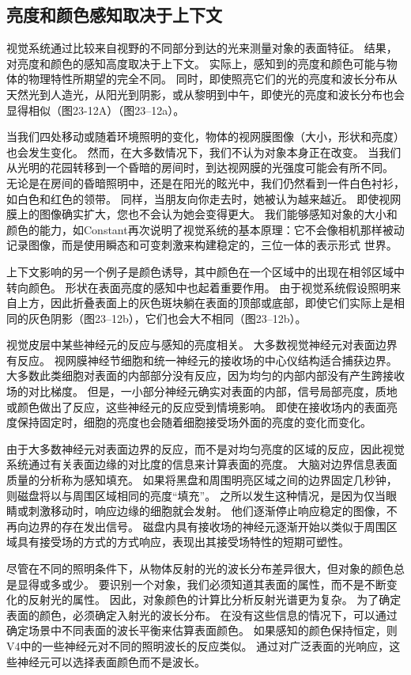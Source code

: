 \subsection{亮度和颜色感知取决于上下文}
视觉系统通过比较来自视野的不同部分到达的光来测量对象的表面特征。 结果，对亮度和颜色的感知高度取决于上下文。 实际上，感知到的亮度和颜色可能与物体的物理特性所期望的完全不同。 同时，即使照亮它们的光的亮度和波长分布从天然光到人造光，从阳光到阴影，或从黎明到中午，即使光的亮度和波长分布也会显得相似（图23-12A）（图23–12a）。

当我们四处移动或随着环境照明的变化，物体的视网膜图像（大小，形状和亮度）也会发生变化。 然而，在大多数情况下，我们不认为对象本身正在改变。 当我们从光明的花园转移到一个昏暗的房间时，到达视网膜的光强度可能会有所不同。 无论是在房间的昏暗照明中，还是在阳光的眩光中，我们仍然看到一件白色衬衫，如白色和红色的领带。 同样，当朋友向你走去时，她被认为越来越近。 即使视网膜上的图像确实扩大，您也不会认为她会变得更大。 我们能够感知对象的大小和颜色的能力，如Constant再次说明了视觉系统的基本原理：它不会像相机那样被动记录图像，而是使用瞬态和可变刺激来构建稳定的，三位一体的表示形式 世界。

上下文影响的另一个例子是颜色诱导，其中颜色在一个区域中的出现在相邻区域中转向颜色。 形状在表面亮度的感知中也起着重要作用。 由于视觉系统假设照明来自上方，因此折叠表面上的灰色斑块躺在表面的顶部或底部，即使它们实际上是相同的灰色阴影（图23–12b），它们也会大不相同（图23–12b）。

视觉皮层中某些神经元的反应与感知的亮度相关。 大多数视觉神经元对表面边界有反应。 视网膜神经节细胞和统一神经元的接收场的中心仪结构适合捕获边界。 大多数此类细胞对表面的内部部分没有反应，因为均匀的内部内部没有产生跨接收场的对比梯度。 但是，一小部分神经元确实对表面的内部，信号局部亮度，质地或颜色做出了反应，这些神经元的反应受到情境影响。 即使在接收场内的表面亮度保持固定时，细胞的亮度也会随着细胞接受场外面的亮度的变化而变化。

由于大多数神经元对表面边界的反应，而不是对均匀亮度的区域的反应，因此视觉系统通过有关表面边缘的对比度的信息来计算表面的亮度。 大脑对边界信息表面质量的分析称为感知填充。 如果将黑盘和周围明亮区域之间的边界固定几秒钟，则磁盘将以与周围区域相同的亮度“填充”。 之所以发生这种情况，是因为仅当眼睛或刺激移动时，响应边缘的细胞就会发射。 他们逐渐停止响应稳定的图像，不再向边界的存在发出信号。 磁盘内具有接收场的神经元逐渐开始以类似于周围区域具有接受场的方式的方式响应，表现出其接受场特性的短期可塑性。

尽管在不同的照明条件下，从物体反射的光的波长分布差异很大，但对象的颜色总是显得或多或少。 要识别一个对象，我们必须知道其表面的属性，而不是不断变化的反射光的属性。 因此，对象颜色的计算比分析反射光谱更为复杂。 为了确定表面的颜色，必须确定入射光的波长分布。 在没有这些信息的情况下，可以通过确定场景中不同表面的波长平衡来估算表面颜色。 如果感知的颜色保持恒定，则V4中的一些神经元对不同的照明波长的反应类似。 通过对广泛表面的光响应，这些神经元可以选择表面颜色而不是波长。

